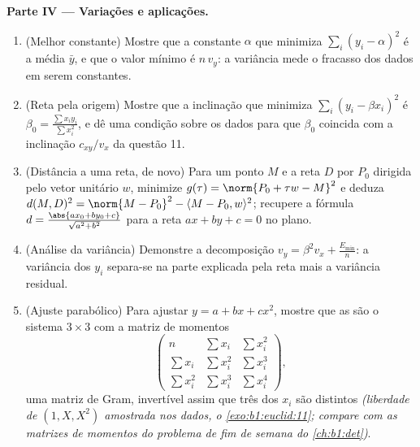 \begin{problem}
\medskip
\noindent\textbf{Parte IV --- Variações e aplicações.}
\begin{enumerate}[resume]
  \item (Melhor constante) Mostre que a constante $\alpha$ que
        minimiza $\sum_i (y_i - \alpha)^2$ é a média $\bar
        y$, e que o valor mínimo é
        $n\,v_y$: a variância mede o fracasso dos dados em serem
        constantes.
  \item (Reta pela origem) Mostre que a inclinação que minimiza
        $\sum_i (y_i - \beta x_i)^2$ é $\beta_0 = \frac{\sum
        x_iy_i}{\sum x_i^2}$, e dê uma condição sobre os dados para que
        $\beta_0$ coincida com a inclinação $c_{xy}/v_x$ da questão 11.
  \item (Distância a uma reta, de novo) Para um ponto $M$ e a reta
        $D$ por $P_0$ dirigida pelo vetor unitário $w$, minimize
        $g(\tau) = \norm{P_0 + \tau w - M}^2$ e deduza $d(M, D)^2 = \norm{M - P_0}^2 - \langle M - P_0,
        w\rangle^2$; recupere a fórmula $d = \frac{\abs{a x_0 +
        b y_0 + c}}{\sqrt{a^2 + b^2}}$ para a reta
        $ax + by + c
        = 0$ no plano.
  \item (Análise da variância) Demonstre a decomposição $v_y =
        \beta^2 v_x + \frac{E_{\min}}n$: a
        variância dos $y_i$ separa-se na parte explicada pela reta
        mais a variância residual.
  \item (Ajuste parabólico) Para ajustar $y = a + bx + cx^2$, mostre que as
         são o sistema $3 \times 3$ com a matriz de
        momentos
        \[
        \begin{pmatrix}
        n & \sum x_i & \sum x_i^2\\
        \sum x_i & \sum x_i^2 & \sum x_i^3\\
        \sum x_i^2 & \sum x_i^3 & \sum x_i^4
        \end{pmatrix},
        \]
        uma matriz de Gram, invertível assim que três dos $x_i$ são
        distintos \emph{(liberdade de $(1, X, X^2)$ amostrada nos dados, o
        \cref{exo:b1:euclid:11}; compare com as matrizes de momentos do problema de fim
        de semana do \cref{ch:b1:det})}.
\end{enumerate}


\end{problem}
